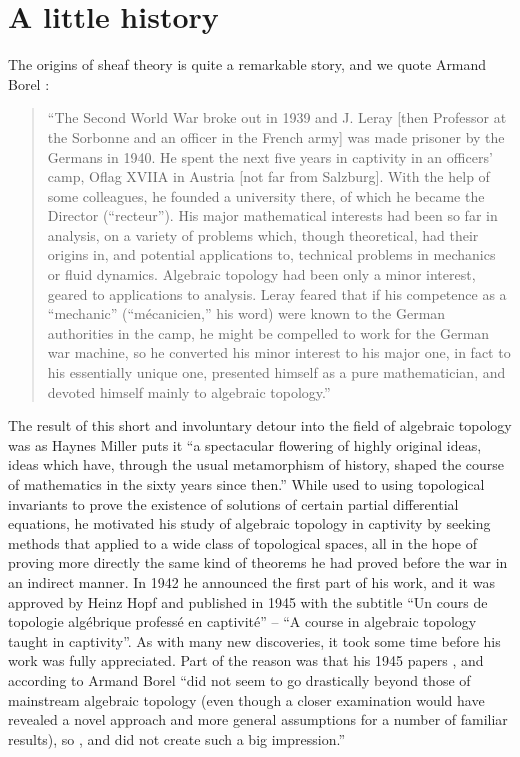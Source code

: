 \documentclass[../../thesis.tex]{subfiles}
\begin{document}
\section{A little history}
The origins of sheaf theory is quite a remarkable story, and we quote Armand Borel \cite{Borel}:
\begin{quotation}
    ``The Second World War broke out in 1939 and J. Leray [then Professor at the Sorbonne and an officer in the French army] was made prisoner by the Germans in 1940.
    He spent the next five years in captivity in an officers’ camp, Oflag XVIIA in Austria [not far from Salzburg].
    With the help of some colleagues, he founded a university there, of which he became the Director (“recteur”).
    His major mathematical interests had been so far in analysis, on a variety of problems which, though theoretical, had their origins in, and potential applications to, technical problems in mechanics or fluid dynamics.
    Algebraic topology had been only a minor interest, geared to applications to analysis. Leray feared that if his competence as a “mechanic” (“mécanicien,” his word) were known to the German authorities in the camp, he might be compelled to work for the German war machine, so he converted his minor interest to his major one, in fact to his essentially unique one, presented himself as a pure mathematician, and devoted himself mainly to algebraic topology.''
\end{quotation}
The result of this short and involuntary detour into the field of algebraic topology was as Haynes Miller \cite{H.Miller} puts it ``a spectacular flowering of highly original ideas, ideas which have, through the usual metamorphism of history, shaped the course of mathematics in the sixty years since then.''
While used to using topological invariants to prove the existence of solutions of certain partial differential equations, he motivated his study of algebraic topology in captivity by seeking methods that applied to a wide class of topological spaces, all in the hope of proving more directly the same kind of theorems he had proved before the war in an indirect manner.
In 1942 he announced the first part of his work, and it was approved by Heinz Hopf and published in 1945 with the subtitle ``Un cours de topologie algébrique professé en captivité'' -- ``A course in algebraic topology taught in captivity''.
As with many new discoveries, it took some time before his work was fully appreciated.
Part of the reason was that his 1945 papers \cite{Leray45a2},\cite{Leray45b2} and \cite{Leray45c2} according to Armand Borel \cite{BorelAMS} ``did not seem to go drastically beyond those of mainstream algebraic topology (even though a closer examination would have revealed a novel approach and more general assumptions for a number of familiar results), so \cite{Leray45a2},\cite{Leray45b2} and \cite{Leray45c2} did not create such a big impression.''
\end{document}
